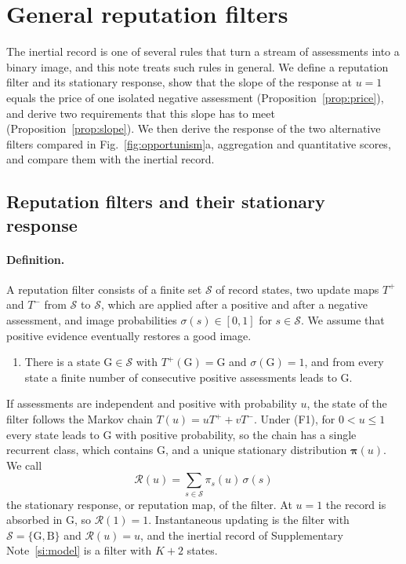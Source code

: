 \documentclass[10pt]{wlscirep}
\newcommand{\Rmap}{\mathscr{R}}            %
\newcommand{\st}[1]{\mathrm{#1}}           %
\theoremstyle{plain}
\theoremstyle{remark}
\begin{document}
\FloatBarrier
\section{General reputation filters}
\label{si:filters}

The inertial record is one of several rules that turn a stream of assessments into a binary image, and this note treats such rules in general. We define a reputation filter and its stationary response, show that the slope of the response at $u=1$ equals the price of one isolated negative assessment (Proposition~\ref{prop:price}), and derive two requirements that this slope has to meet (Proposition~\ref{prop:slope}). We then derive the response of the two alternative filters compared in Fig.~\ref{fig:opportunism}a, aggregation and quantitative scores, and compare them with the inertial record.

\subsection{Reputation filters and their stationary response}

\paragraph{Definition.} A reputation filter consists of a finite set $\mathcal S$ of record states, two update maps $T^+$ and $T^-$ from $\mathcal S$ to $\mathcal S$, which are applied after a positive and after a negative assessment, and image probabilities $\sigma(s)\in[0,1]$ for $s\in\mathcal S$. We assume that positive evidence eventually restores a good image.
\begin{enumerate}
\item[(F1)] There is a state $\st G\in\mathcal S$ with $T^+(\st G)=\st G$ and $\sigma(\st G)=1$, and from every state a finite number of consecutive positive assessments leads to $\st G$.
\end{enumerate}
If assessments are independent and positive with probability $u$, the state of the filter follows the Markov chain $T(u)=uT^++vT^-$. Under (F1), for $0<u\leq1$ every state leads to $\st G$ with positive probability, so the chain has a single recurrent class, which contains $\st G$, and a unique stationary distribution $\bm\pi(u)$. We call
\begin{equation}
\Rmap(u)=\sum_{s\in\mathcal S}\pi_s(u)\,\sigma(s)
\label{eq:s-filter-response}
\end{equation}
the stationary response, or reputation map, of the filter. At $u=1$ the record is absorbed in $\st G$, so $\Rmap(1)=1$. Instantaneous updating is the filter with $\mathcal S=\{\st G,\st B\}$ and $\Rmap(u)=u$, and the inertial record of Supplementary Note~\ref{si:model} is a filter with $K+2$ states.
\end{document}
